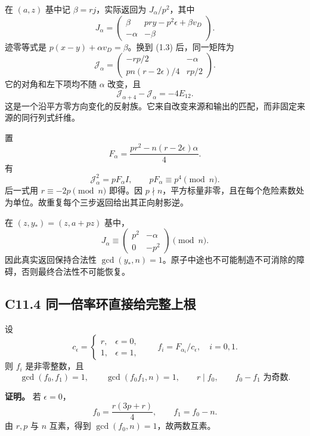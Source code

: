 {在} \((a,z)\) {基中记} \(\beta=rj\){，实际返回为} \(J_\alpha/p^2\){，其中} \[
J_\alpha=
\begin{pmatrix}
\beta&pry-p^2\epsilon+\beta v_D\\
-\alpha&-\beta
\end{pmatrix}.
\tag{C11.3.1}
\] {迹零等式是} \(p(x-y)+\alpha v_D=\beta\){。换到} {(1.3)} {后，同一矩阵为} \[
\boxed{
\mathcal J_\alpha=
\begin{pmatrix}
-rp/2&-\alpha\\
pn(r-2\epsilon)/4&rp/2
\end{pmatrix}.}
\tag{C11.3.2}
\] {它的对角和左下项均不随} \(\alpha\) {改变，且} \[
\mathcal J_{\alpha+4}-\mathcal J_\alpha=-4E_{12}.
\tag{C11.3.3}
\] {这是一个沿平方零方向变化的反射族。它来自改变来源和输出的匹配，而非固定来源的同行列式纤维。}

{置} \[
F_\alpha=\frac{pr^2-n(r-2\epsilon)\alpha}{4}.
\] {有} \[
\mathcal J_\alpha^2=pF_\alpha I,\qquad
pF_\alpha\equiv p^4\pmod n.
\tag{C11.3.4}
\] {后一式用} \(r\equiv-2p\pmod n\) {即得。因} \(p\nmid n\){，平方标量非零，且在每个危险素数处为单位。故重复每个三步返回给出其正向射影逆。}

{在} \((z,y_*)=(z,a+pz)\) {基中，} \[
J_\alpha\equiv
\begin{pmatrix}p^2&-\alpha\\0&-p^2\end{pmatrix}\pmod n.
\tag{C11.3.5}
\] {因此真实返回保持合法性} \(\gcd(y_*,n)=1\){。原子中途也不可能制造不可消除的障碍，否则最终合法性不可能恢复。}

\subsection*{\texorpdfstring{{C11.4} {同一倍率环直接给完整上根}}{C11.4 同一倍率环直接给完整上根}}\label{C11-h81}

{设} \[
c_\epsilon=\begin{cases}r,&\epsilon=0,\\1,&\epsilon=1,\end{cases}
\qquad f_i=F_{\alpha_i}/c_\epsilon,\quad i=0,1.
\tag{C11.4.1}
\] {则} \(f_i\) {是非零整数，且} \[
\gcd(f_0,f_1)=1,\qquad
\gcd(f_0f_1,n)=1,\qquad
r\mid f_0,\qquad f_0-f_1\text{ 为奇数}.
\tag{C11.4.2}
\]

\textbf{{证明。}} {若} \(\epsilon=0\){，} \[
f_0=\frac{r(3p+r)}4,\qquad f_1=f_0-n.
\] {由} \(r,p\) {与} \(n\) {互素，得到} \(\gcd(f_0,n)=1\){，故两数互素。}


